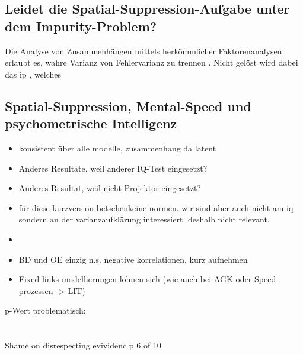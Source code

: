 \documentclass[11pt, twoside, a4paper]{book}		%
\begin{document}
%






\subsection{Leidet die Spa\-tial-Sup\-pres\-sion-Auf\-gabe unter dem Im\-pu\-ri\-ty-Pro\-blem?}

Die Analyse von Zusammenhängen mittels herkömmlicher Faktorenanalysen erlaubt es, wahre Varianz von Fehlervarianz zu trennen \citep[S. 9]{Kline2011}. Nicht gelöst wird dabei das \gls{ip} \citep{Schweizer2007}, welches 





\clearpage
\subsection{Spatial-Suppression, Mental-Speed und psychometrische Intelligenz}



\begin{itemize}
	\item konsistent über alle modelle, zusammenhang da latent
	\item Anderes Resultate, weil anderer IQ-Test eingesetzt?
	\item Anderes Resultat, weil nicht Projektor eingesetzt?
	\item für diese kurzversion betsehenkeine normen. wir sind aber auch nicht am iq sondern an der varianzaufklärung interessiert. deshalb nicht relevant.
	\item 
	\item BD und OE einzig n.s. negative korrelationen, kurz aufnehmen
	\item Fixed-links modellierungen lohnen sich (wie auch bei AGK oder Speed prozessen -> LIT)
\end{itemize}


p-Wert problematisch:\\
\citet{Gelman2006}\\
\citet{Wasserstein2016}\\
\citet{Nuzzo2014}
\citet{Hayduk2014} Shame on disrespecting evividenc p 6 of 10
\end{document}
